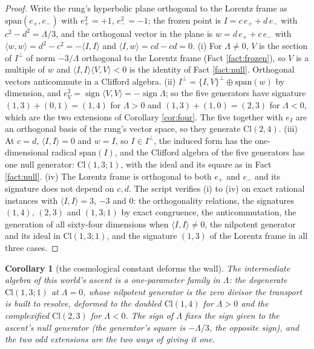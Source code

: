 \documentclass[11pt]{article}
\newtheorem{corollary}[theorem]{Corollary}
\theoremstyle{definition}
\newcommand{\Cl}{\mathrm{Cl}}
\newcommand{\ip}[2]{\langle #1, #2\rangle}
\begin{document}
\begin{proof}
Write the rung's hyperbolic plane orthogonal to the Lorentz frame as $\mathrm{span}(e_{+}, e_{-})$ with $e_{+}^{2} = +1$, $e_{-}^{2} = -1$; the frozen point is $I = c\,e_{+} + d\,e_{-}$ with $c^{2} - d^{2} = \Lambda/3$, and the orthogonal vector in the plane is $w = d\,e_{+} + c\,e_{-}$ with $\ip{w}{w} = d^{2} - c^{2} = -\ip{I}{I}$ and $\ip{I}{w} = cd - cd = 0$. (i) For $\Lambda \neq 0$, $V$ is the section of $I^{\perp}$ of norm $-3/\Lambda$ orthogonal to the Lorentz frame (Fact \ref{fact:frozen}), so $V$ is a multiple of $w$ and $\ip{I}{I}\ip{V}{V} < 0$ is the identity of Fact \ref{fact:null}. Orthogonal vectors anticommute in a Clifford algebra. (ii) $I^{\perp} = \{I,V\}^{\perp} \oplus \mathrm{span}(w)$ by dimension, and $e_{V}^{2} = \operatorname{sign}\ip{V}{V} = -\operatorname{sign}\Lambda$; so the five generators have signature $(1,3) + (0,1) = (1,4)$ for $\Lambda > 0$ and $(1,3) + (1,0) = (2,3)$ for $\Lambda < 0$, which are the two extensions of Corollary \ref{cor:four}. The five together with $e_{I}$ are an orthogonal basis of the rung's vector space, so they generate $\Cl(2,4)$. (iii) At $c = d$, $\ip{I}{I} = 0$ and $w = I$, so $I \in I^{\perp}$, the induced form has the one-dimensional radical $\mathrm{span}(I)$, and the Clifford algebra of the five generators has one null generator: $\Cl(1,3;1)$, with the ideal and its square as in Fact \ref{fact:null}. (iv) The Lorentz frame is orthogonal to both $e_{+}$ and $e_{-}$ and its signature does not depend on $c, d$. The script verifies (i) to (iv) on exact rational instances with $\ip{I}{I} = 3$, $-3$ and $0$: the orthogonality relations, the signatures $(1,4)$, $(2,3)$ and $(1,3;1)$ by exact congruence, the anticommutation, the generation of all sixty-four dimensions when $\ip{I}{I} \neq 0$, the nilpotent generator and its ideal in $\Cl(1,3;1)$, and the signature $(1,3)$ of the Lorentz frame in all three cases.
\end{proof}

\begin{corollary}[the cosmological constant deforms the wall]\label{cor:wall}
The intermediate algebra of this world's ascent is a one-parameter family in $\Lambda$: the degenerate $\Cl(1,3;1)$ at $\Lambda = 0$, whose nilpotent generator is the zero divisor the transport is built to resolve, deformed to the doubled $\Cl(1,4)$ for $\Lambda > 0$ and the complexified $\Cl(2,3)$ for $\Lambda < 0$. The sign of $\Lambda$ fixes the sign given to the ascent's null generator (the generator's square is $-\Lambda/3$, the opposite sign), and the two odd extensions are the two ways of giving it one.
\end{corollary}
\end{document}

